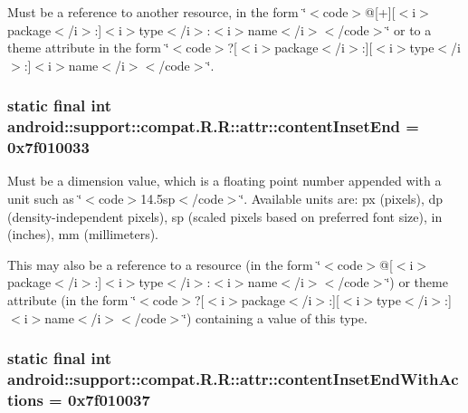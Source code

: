 Must be a reference to another resource, in the form \char`\"{}$<$code$>$@\mbox{[}+\mbox{]}\mbox{[}$<$i$>$package$<$/i$>$:\mbox{]}$<$i$>$type$<$/i$>$:$<$i$>$name$<$/i$>$$<$/code$>$\char`\"{} or to a theme attribute in the form \char`\"{}$<$code$>$?\mbox{[}$<$i$>$package$<$/i$>$:\mbox{]}\mbox{[}$<$i$>$type$<$/i$>$:\mbox{]}$<$i$>$name$<$/i$>$$<$/code$>$\char`\"{}. \hypertarget{classandroid_1_1support_1_1compat_1_1_r_1_1attr_9ac722cc06ac8f4b3ed7820ea14432f7}{
\subsubsection[{contentInsetEnd}]{\setlength{\rightskip}{0pt plus 5cm}static final int android::support::compat.R.R::attr::contentInsetEnd = 0x7f010033}}
\label{classandroid_1_1support_1_1compat_1_1_r_1_1attr_9ac722cc06ac8f4b3ed7820ea14432f7}


Must be a dimension value, which is a floating point number appended with a unit such as \char`\"{}$<$code$>$14.5sp$<$/code$>$\char`\"{}. Available units are: px (pixels), dp (density-independent pixels), sp (scaled pixels based on preferred font size), in (inches), mm (millimeters). 

This may also be a reference to a resource (in the form \char`\"{}$<$code$>$@\mbox{[}$<$i$>$package$<$/i$>$:\mbox{]}$<$i$>$type$<$/i$>$:$<$i$>$name$<$/i$>$$<$/code$>$\char`\"{}) or theme attribute (in the form \char`\"{}$<$code$>$?\mbox{[}$<$i$>$package$<$/i$>$:\mbox{]}\mbox{[}$<$i$>$type$<$/i$>$:\mbox{]}$<$i$>$name$<$/i$>$$<$/code$>$\char`\"{}) containing a value of this type. \hypertarget{classandroid_1_1support_1_1compat_1_1_r_1_1attr_57964e1bc73c0484ddc4eb2396bbb034}{
\subsubsection[{contentInsetEndWithActions}]{\setlength{\rightskip}{0pt plus 5cm}static final int android::support::compat.R.R::attr::contentInsetEndWithActions = 0x7f010037}}
\label{classandroid_1_1support_1_1compat_1_1_r_1_1attr_57964e1bc73c0484ddc4eb2396bbb034}


